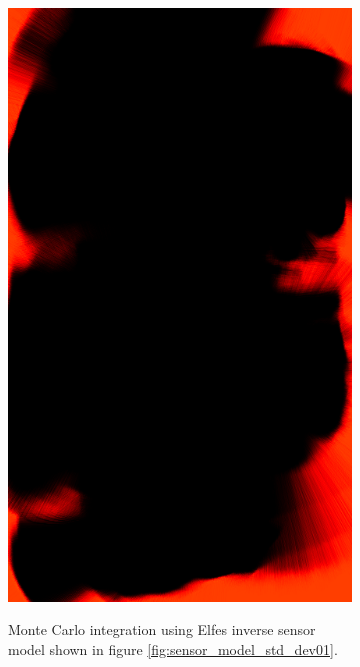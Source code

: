 \begin{figure}[htbp]
	\centering
	\begin{subfigure}[t]{0.45\textwidth}
		\includegraphics[width=\textwidth]{figures/static_mapping/monte_carlo_map_hector}
		\label{fig:particle_hector_sensor-croped}
		\caption{Monte Carlo integration using Elfes inverse sensor model shown in figure \ref{fig:sensor_model_std_dev01}.}
	\end{subfigure}
	\begin{subfigure}[t]{0.45\textwidth}

\end{subfigure}
\end{figure}
